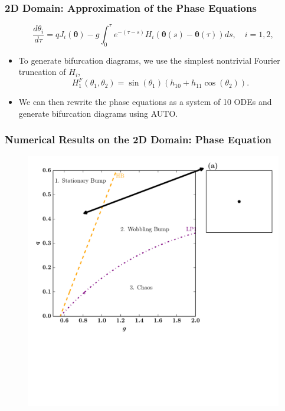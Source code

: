 \documentclass{beamer}
\newcommand{\q}{\boldsymbol{\theta}}
\begin{document}
\begin{frame}
 \frametitle{2D Domain: Approximation of the Phase Equations}
  \begin{equation*}
\frac{d\theta_i}{d\tau} = qJ_i(\q) -g\int_0^\tau e^{-(\tau-s)} H_i(\q(s)-\q(\tau))ds, \quad i=1,2,
\end{equation*}
\begin{itemize}
 \item<1->  To generate bifurcation diagrams, we use the simplest nontrivial Fourier truncation of $H_i$,
\begin{equation*}
 H^F_1(\theta_1,\theta_2) =  \sin(\theta_1)(h_{10} + h_{11}\cos(\theta_2)).
\end{equation*}
\item<2-> We can then rewrite the phase equations as a system of 10 ODEs and generate bifurcation diagrams using AUTO.
\end{itemize}

\end{frame}


\begin{frame}
\frametitle{Numerical Results on the 2D Domain: Phase Equation}
\begin{figure}
 \includegraphics[width=.6\textwidth]{twod_phase_2par1.pdf}

\end{figure}
\end{frame}
\end{document}
